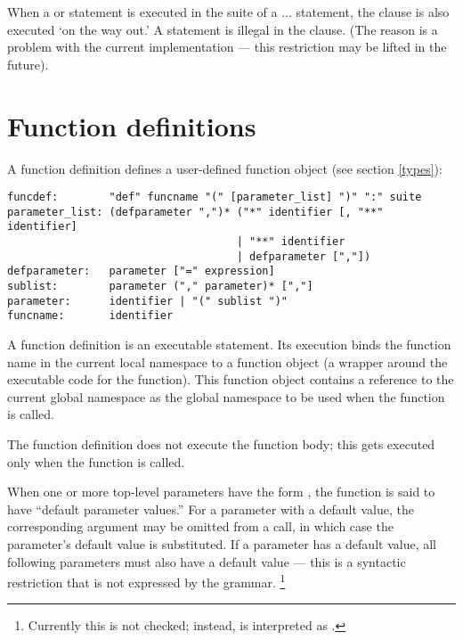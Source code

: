 When a  or  statement is executed in the
 suite of a ... statement, the
 clause is also executed `on the way out.'  A
 statement is illegal in the  clause.  (The
reason is a problem with the current implementation --- this
restriction may be lifted in the future).

\section{Function definitions} \label{function}

A function definition defines a user-defined function object (see
section \ref{types}):

\begin{verbatim}
funcdef:        "def" funcname "(" [parameter_list] ")" ":" suite
parameter_list: (defparameter ",")* ("*" identifier [, "**" identifier] 
                                    | "**" identifier 
                                    | defparameter [","])
defparameter:   parameter ["=" expression]
sublist:        parameter ("," parameter)* [","]
parameter:      identifier | "(" sublist ")"
funcname:       identifier
\end{verbatim}

A function definition is an executable statement.  Its execution binds
the function name in the current local namespace to a function object
(a wrapper around the executable code for the function).  This
function object contains a reference to the current global namespace
as the global namespace to be used when the function is called.

The function definition does not execute the function body; this gets
executed only when the function is called.

When one or more top-level parameters have the form 
\code{=} , the function is said to have ``default
parameter values.''    For a parameter with a
default value, the corresponding argument may be omitted from a call,
in which case the parameter's default value is substituted.  If a
parameter has a default value, all following parameters must also have
a default value --- this is a syntactic restriction that is not
expressed by the grammar.%
\footnote{Currently this is not checked; instead,
 is interpreted as .}

